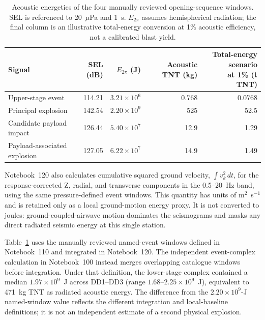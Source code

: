 \documentclass[]{seismica}
\begin{document}
\begin{table}[!tbp]
\centering
\small
\caption{Acoustic energetics of the four manually reviewed opening-sequence
windows. SEL is referenced to 20~$\mu$Pa and 1~s. $E_{2\pi}$ assumes
hemispherical radiation; the final column is an illustrative total-energy
conversion at 1\% acoustic efficiency, not a calibrated blast yield.}
\label{tab:supp_energetics}
\begin{tabularx}{\textwidth}{Xrrrr}
\hline
Signal & SEL (dB) & $E_{2\pi}$ (J) & Acoustic TNT (kg) &
\shortstack{Total-energy scenario\\at 1\% (t TNT)} \\
\hline
Upper-stage event       & 114.21 & $3.21\times10^6$ & 0.768 & 0.0768 \\
Principal explosion     & 142.54 & $2.20\times10^9$ & 525   & 52.5 \\
Candidate payload impact & 126.44 & $5.40\times10^7$ & 12.9  & 1.29 \\
Payload-associated explosion & 127.05 & $6.22\times10^7$ & 14.9  & 1.49 \\
\hline
\end{tabularx}
\end{table}

Notebook~120 also calculates cumulative squared ground velocity,
$\int v_k^2\,dt$, for the response-corrected Z, radial, and transverse
components in the 0.5--20~Hz band, using the same pressure-defined event
windows. This quantity has units of m$^2$~s$^{-1}$ and is retained only as a
local ground-motion energy proxy. It is not converted to joules:
ground-coupled-airwave motion dominates the seismograms and masks any direct
radiated seismic energy at this single station.

Table~\ref{tab:supp_energetics} uses the manually reviewed named-event windows
defined in Notebook~110 and integrated in Notebook~120. The independent
event-complex calculation in Notebook~100 instead merges overlapping catalogue
windows before integration. Under that definition, the lower-stage complex
contained a median $1.97\times10^9$~J across DD1--DD3 (range
$1.68$--$2.25\times10^9$~J), equivalent to 471~kg TNT as radiated acoustic
energy. The difference from the $2.20\times10^9$-J named-window value reflects
the different integration and local-baseline definitions; it is not an
independent estimate of a second physical explosion.
\end{document}
